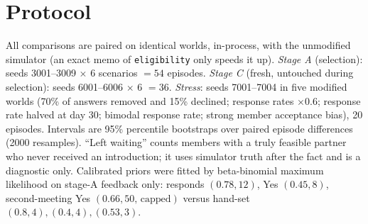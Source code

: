 \documentclass[10pt,a4paper]{article}
\begin{document}
\section{Protocol}
All comparisons are paired on identical worlds, in-process, with the unmodified simulator (an exact memo of \texttt{eligibility} only speeds it up). \emph{Stage A} (selection): seeds 3001--3009 $\times$ 6 scenarios $=54$ episodes. \emph{Stage C} (fresh, untouched during selection): seeds 6001--6006 $\times$ 6 $=36$. \emph{Stress}: seeds 7001--7004 in five modified worlds (70\% of answers removed and 15\% declined; response rates $\times0.6$; response rate halved at day 30; bimodal response rate; strong member acceptance bias), 20 episodes. Intervals are 95\% percentile bootstraps over paired episode differences (2000 resamples). ``Left waiting'' counts members with a truly feasible partner who never received an introduction; it uses simulator truth after the fact and is a diagnostic only. Calibrated priors were fitted by beta-binomial maximum likelihood on stage-A feedback only: responds $(0.78,12)$, Yes $(0.45,8)$, second-meeting Yes $(0.66,50\text{, capped})$ versus hand-set $(0.8,4),(0.4,4),(0.53,3)$.
\end{document}

